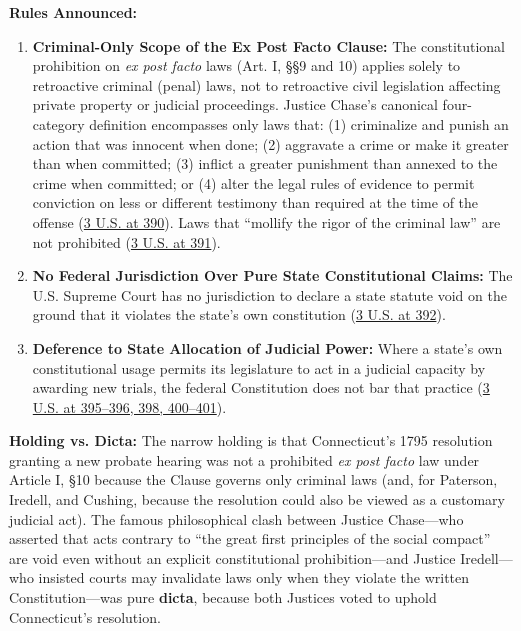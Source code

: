 \documentclass[12pt]{article}
\begin{document}
\textbf{Rules Announced:}
\begin{enumerate}
  \item \textbf{Criminal-Only Scope of the Ex Post Facto Clause:} The constitutional prohibition on \textit{ex post facto} laws (Art. I, \S\S 9 and 10) applies solely to retroactive criminal (penal) laws, not to retroactive civil legislation affecting private property or judicial proceedings. Justice Chase's canonical four-category definition encompasses only laws that: (1) criminalize and punish an action that was innocent when done; (2) aggravate a crime or make it greater than when committed; (3) inflict a greater punishment than annexed to the crime when committed; or (4) alter the legal rules of evidence to permit conviction on less or different testimony than required at the time of the offense (\href{https://supreme.justia.com/cases/federal/us/3/386/}{3 U.S. at 390}). Laws that ``mollify the rigor of the criminal law'' are not prohibited (\href{https://supreme.justia.com/cases/federal/us/3/386/}{3 U.S. at 391}).
  \item \textbf{No Federal Jurisdiction Over Pure State Constitutional Claims:} The U.S. Supreme Court has no jurisdiction to declare a state statute void on the ground that it violates the state's own constitution (\href{https://supreme.justia.com/cases/federal/us/3/386/}{3 U.S. at 392}).
  \item \textbf{Deference to State Allocation of Judicial Power:} Where a state's own constitutional usage permits its legislature to act in a judicial capacity by awarding new trials, the federal Constitution does not bar that practice (\href{https://supreme.justia.com/cases/federal/us/3/386/}{3 U.S. at 395--396, 398, 400--401}).
\end{enumerate}

\textbf{Holding vs. Dicta:} The narrow holding is that Connecticut's 1795 resolution granting a new probate hearing was not a prohibited \textit{ex post facto} law under Article I, \S 10 because the Clause governs only criminal laws (and, for Paterson, Iredell, and Cushing, because the resolution could also be viewed as a customary judicial act). The famous philosophical clash between Justice Chase---who asserted that acts contrary to ``the great first principles of the social compact'' are void even without an explicit constitutional prohibition---and Justice Iredell---who insisted courts may invalidate laws only when they violate the written Constitution---was pure \textbf{dicta}, because both Justices voted to uphold Connecticut's resolution.
\end{document}
